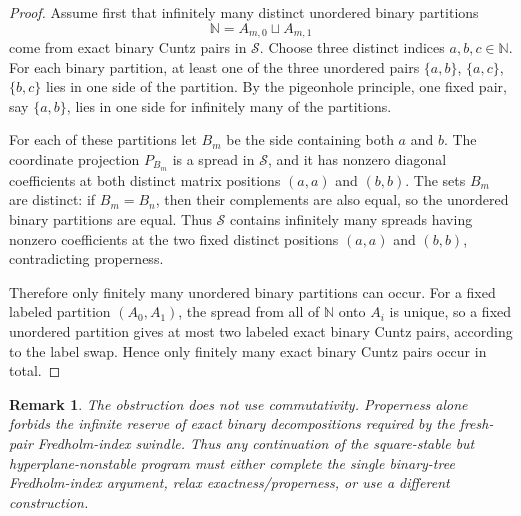 \documentclass[11pt]{article}
\newtheorem{remark}{Remark}
\begin{document}
\begin{proof}
Assume first that infinitely many distinct unordered binary partitions
\[
\mathbb N=A_{m,0}\sqcup A_{m,1}
\]
come from exact binary Cuntz pairs in $\mathcal S$.  Choose three distinct
indices $a,b,c\in\mathbb N$.  For each binary partition, at least one of the
three unordered pairs $\{a,b\}$, $\{a,c\}$, $\{b,c\}$ lies in one side of the
partition.  By the pigeonhole principle, one fixed pair, say $\{a,b\}$, lies
in one side for infinitely many of the partitions.

For each of these partitions let $B_m$ be the side containing both $a$ and
$b$.  The coordinate projection $P_{B_m}$ is a spread in $\mathcal S$, and it
has nonzero diagonal coefficients at both distinct matrix positions $(a,a)$
and $(b,b)$.  The sets $B_m$ are distinct: if $B_m=B_n$, then their complements
are also equal, so the unordered binary partitions are equal.  Thus
$\mathcal S$ contains infinitely many spreads having nonzero coefficients at
the two fixed distinct positions $(a,a)$ and $(b,b)$, contradicting
properness.

Therefore only finitely many unordered binary partitions can occur.  For a
fixed labeled partition $(A_0,A_1)$, the spread from all of $\mathbb N$ onto
$A_i$ is unique, so a fixed unordered partition gives at most two labeled
exact binary Cuntz pairs, according to the label swap.  Hence only finitely
many exact binary Cuntz pairs occur in total.
\end{proof}

\begin{remark}
The obstruction does not use commutativity.  Properness alone forbids the
infinite reserve of exact binary decompositions required by the fresh-pair
Fredholm-index swindle.  Thus any continuation of the square-stable but
hyperplane-nonstable program must either complete the single binary-tree
Fredholm-index argument, relax exactness/properness, or use a different
construction.
\end{remark}
\end{document}
